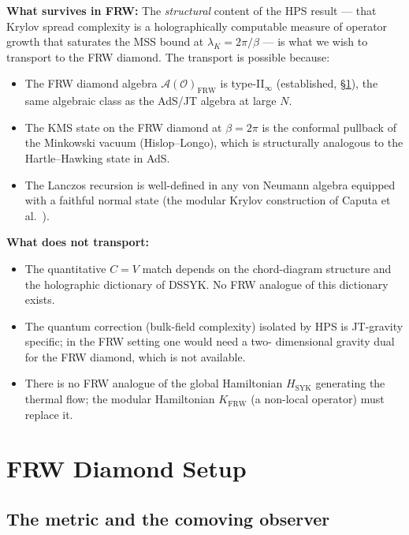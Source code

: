 \documentclass[12pt,a4paper]{article}
\theoremstyle{definition}
\newcommand{\lK}{\lambda_K}
\newcommand{\FRW}{\mathrm{FRW}}
\begin{document}
\textbf{What survives in FRW:}
The \emph{structural} content of the HPS result --- that Krylov
spread complexity is a holographically computable measure of operator
growth that saturates the MSS bound at $\lK = 2\pi/\beta$ ---
is what we wish to transport to the FRW diamond.
The transport is possible because:
\begin{itemize}
\item The FRW diamond algebra $\mathcal{A}(\mathcal{O})_\FRW$ is
  type-II$_\infty$ (established, \S\ref{sec:FRW-setup}),
  the same algebraic class as the AdS/JT algebra at large $N$.
\item The KMS state on the FRW diamond at $\beta = 2\pi$ is the
  conformal pullback of the Minkowski vacuum (Hislop--Longo), which
  is structurally analogous to the Hartle--Hawking state in AdS.
\item The Lanczos recursion is well-defined in any von Neumann algebra
  equipped with a faithful normal state (the modular Krylov construction
  of Caputa et al.~\cite{Caputa2024}).
\end{itemize}

\textbf{What does not transport:}
\begin{itemize}
\item The quantitative $C = V$ match depends on the chord-diagram
  structure and the holographic dictionary of DSSYK. No FRW analogue
  of this dictionary exists.
\item The quantum correction (bulk-field complexity) isolated by HPS
  is JT-gravity specific; in the FRW setting one would need a two-
  dimensional gravity dual for the FRW diamond, which is not available.
\item There is no FRW analogue of the global Hamiltonian $H_\mathrm{SYK}$
  generating the thermal flow; the modular Hamiltonian $K_\FRW$ (a
  non-local operator) must replace it.
\end{itemize}

\section{FRW Diamond Setup}
\label{sec:FRW-setup}

\subsection{The metric and the comoving observer}
\end{document}
